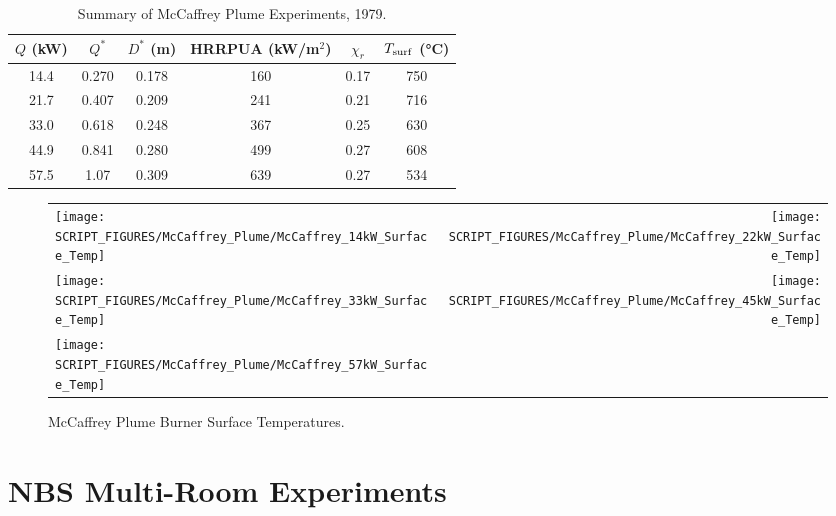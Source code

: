 \begin{table}[!ht]
\caption[Summary of McCaffrey Plume Experiments]{Summary of McCaffrey Plume Experiments, 1979.}
\begin{center}
\begin{tabular}{|c|c|c|c|c|c|}
\hline
$Q$ (kW) & $Q^*$    & $D^*$ (m)   & HRRPUA (kW/m$^2$)  & $\chi_r$ & $T_{\rm surf}$ (\si{\degreeCelsius}) \\ \hline\hline
14.4     & 0.270    & 0.178       & 160                & 0.17     & 750 \\ \hline
21.7     & 0.407    & 0.209       & 241                & 0.21     & 716 \\ \hline
33.0     & 0.618    & 0.248       & 367                & 0.25     & 630 \\ \hline
44.9     & 0.841    & 0.280       & 499                & 0.27     & 608 \\ \hline
57.5     & 1.07     & 0.309       & 639                & 0.27     & 534 \\ \hline
\end{tabular}
\end{center}
\label{tab:McCaffrey_Plume_Exp}
\end{table}

\begin{figure}[p]
\begin{tabular*}{\textwidth}{l@{\extracolsep{\fill}}r}
\texttt{[image: SCRIPT\_FIGURES/McCaffrey\_Plume/McCaffrey\_14kW\_Surface\_Temp]} &
\texttt{[image: SCRIPT\_FIGURES/McCaffrey\_Plume/McCaffrey\_22kW\_Surface\_Temp]} \\
\texttt{[image: SCRIPT\_FIGURES/McCaffrey\_Plume/McCaffrey\_33kW\_Surface\_Temp]} &
\texttt{[image: SCRIPT\_FIGURES/McCaffrey\_Plume/McCaffrey\_45kW\_Surface\_Temp]} \\
\texttt{[image: SCRIPT\_FIGURES/McCaffrey\_Plume/McCaffrey\_57kW\_Surface\_Temp]} &
\end{tabular*}
\caption[McCaffrey Plume Burner Surface Temperatures]
{McCaffrey Plume Burner Surface Temperatures.}
\label{fig:McCaffrey_Surf_Temp}
\end{figure}



\section{NBS Multi-Room Experiments}
\label{NBS_Multi-Room_Description}

